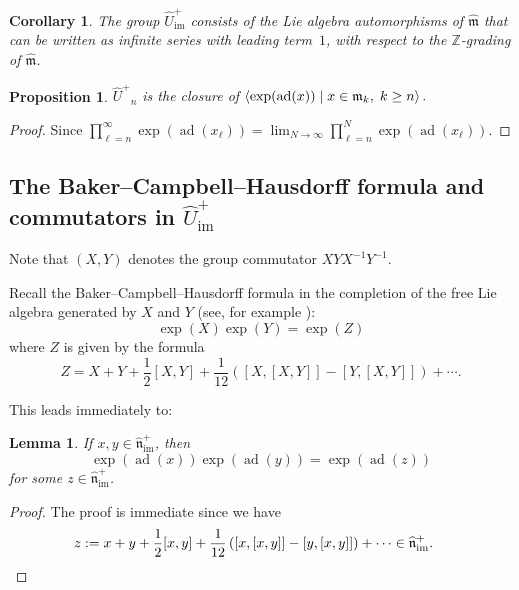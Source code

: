 \documentclass[11pt,letterpaper]{amsart}
\newcounter{thecounter}
\numberwithin{thecounter}{section}
\newtheorem{lemma}[thecounter]{Lemma}
\newtheorem{proposition}[thecounter]{Proposition}
\newtheorem{corollary}[thecounter]{Corollary}
\theoremstyle{definition}
\DeclareMathOperator{\ad}{ad}
\DeclareMathOperator{\im}{{im}}
\newcommand{\Z}{{\mathbb Z}}
\newcommand{\Uhp}{{\widehat{U}^+}}
\newcommand{\Uhimp}{{\widehat{U}_{\im}^+}}
\newcommand{\mhat}{{\widehat{\mathfrak{m}}}}
\newcommand{\nhimp}{{\widehat{\mathfrak{n}}_{\im}^+}}
\begin{document}
\begin{corollary} The group $\Uhimp$ consists of the Lie algebra automorphisms of $\mhat$ that can be written as infinite series with leading term~$1$, with respect to the $\Z$-grading of $\mhat$.
\end{corollary}


\begin{proposition} \label{C-closure}
$\Uhp_n$ is the closure of 
$\left\langle \exp(\ad(x)) \mid x\in{\frak m}_k,\; k\ge n \right\rangle.$
\end{proposition}
\begin{proof} Since
$\prod_{\ell=n}^\infty \exp(\ad(x_\ell)) =\lim_{N\to\infty} \prod_{\ell=n}^N \exp(\ad(x_\ell)).$
\end{proof}


\subsection{The Baker--Campbell--Hausdorff formula and commutators in $\Uhimp$}
Note that  $(X,Y)$ denotes the group commutator $XYX^{-1}Y^{-1}$. 

Recall the Baker--Campbell--Hausdorff  formula in the completion of the free Lie algebra generated by $X$ and $Y$ (see, for example \cite[p.\ 32]{Stern}):
$$ \exp(X)\exp (Y) = \exp(Z)$$
where $Z$ is given by the formula 
$$Z= X+Y+\frac{1}{2}[X,Y]+\frac{1}{12}\left([X,[X,Y]]-[Y,[X,Y]]\right)+\cdots.$$

\begin{shortver}
This leads immediately to:
\end{shortver}

\begin{lemma}\label{BCH}
If $x,y\in \nhimp$, then
$$ \exp(\ad(x))\exp (\ad(y)) = \exp(\ad(z))$$
for some
$z \in \nhimp$.
\end{lemma}

\begin{longver}
\begin{proof}
The proof is immediate since we have 
\begin{align*}
z&:= x+y+\frac{1}{2}[x,y]+\frac{1}{12}\left([x,[x,y]]-[y,[x,y]]\right)+\cdots\in \nhimp.\qedhere
\end{align*}
\end{proof}
\end{longver}
\end{document}
